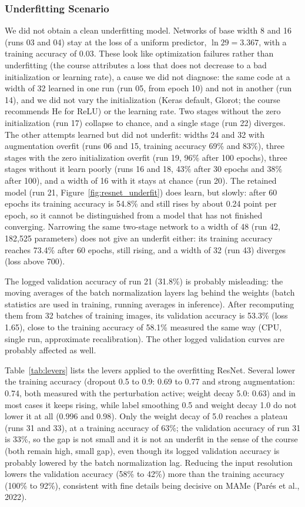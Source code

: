 \documentclass[11pt, a4paper]{article}
\begin{document}
\subsubsection{Underfitting Scenario}
\label{sec:resnet_curves}
We did not obtain a clean underfitting model. Networks of base width 8 and 16 (runs 03 and 04) stay at the loss of a uniform predictor, $\ln 29 = 3.367$, with a training accuracy of 0.03. These look like optimization failures rather than underfitting (the course attributes a loss that does not decrease to a bad initialization or learning rate), a cause we did not diagnose: the same code at a width of 32 learned in one run (run 05, from epoch 10) and not in another (run 14), and we did not vary the initialization (Keras default, Glorot; the course recommends He for ReLU) or the learning rate. Two stages without the zero initialization (run 17) collapse to chance, and a single stage (run 22) diverges. The other attempts learned but did not underfit: widths 24 and 32 with augmentation overfit (runs 06 and 15, training accuracy 69\% and 83\%), three stages with the zero initialization overfit (run 19, 96\% after 100 epochs), three stages without it learn poorly (runs 16 and 18, 43\% after 30 epochs and 38\% after 100), and a width of 16 with it stays at chance (run 20). The retained model (run 21, Figure~\ref{fig:resnet_underfit}) does learn, but slowly: after 60 epochs its training accuracy is 54.8\% and still rises by about 0.24 point per epoch, so it cannot be distinguished from a model that has not finished converging. Narrowing the same two-stage network to a width of 48 (run 42, 182,525 parameters) does not give an underfit either: its training accuracy reaches 73.4\% after 60 epochs, still rising, and a width of 32 (run 43) diverges (loss above 700).

The logged validation accuracy of run 21 (31.8\%) is probably misleading: the moving averages of the batch normalization layers lag behind the weights (batch statistics are used in training, running averages in inference). After recomputing them from 32 batches of training images, its validation accuracy is 53.3\% (loss 1.65), close to the training accuracy of 58.1\% measured the same way (CPU, single run, approximate recalibration). The other logged validation curves are probably affected as well.

Table~\ref{tab:levers} lists the levers applied to the overfitting ResNet. Several lower the training accuracy (dropout 0.5 to 0.9: 0.69 to 0.77 and strong augmentation: 0.74, both measured with the perturbation active; weight decay 5.0: 0.63) and in most cases it keeps rising, while label smoothing 0.5 and weight decay 1.0 do not lower it at all (0.996 and 0.98). Only the weight decay of 5.0 reaches a plateau (runs 31 and 33), at a training accuracy of 63\%; the validation accuracy of run 31 is 33\%, so the gap is not small and it is not an underfit in the sense of the course (both remain high, small gap), even though its logged validation accuracy is probably lowered by the batch normalization lag. Reducing the input resolution lowers the validation accuracy (58\% to 42\%) more than the training accuracy (100\% to 92\%), consistent with fine details being decisive on MAMe (Par\'es et al., 2022).
\end{document}
